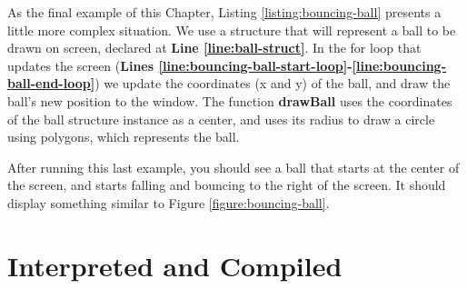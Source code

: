 \documentclass[11pt,fleqn,openany]{book} %
\begin{document}
As the final example of this Chapter, Listing \ref{listing:bouncing-ball} presents a little more complex situation. We use a structure that will represent a ball to be drawn on screen, declared at \textbf{Line \ref{line:ball-struct}}. In the for loop that updates the screen (\textbf{Lines \ref{line:bouncing-ball-start-loop}-\ref{line:bouncing-ball-end-loop}}) we update the coordinates (x and y) of the ball, and draw the ball's new position to the window. The function \textbf{drawBall} uses the coordinates of the ball structure instance as a center, and uses its radius to draw a circle using polygons, which represents the ball.

After running this last example, you should see a ball that starts at the center of the screen, and starts falling and bouncing to the right of the screen. It should display something similar to Figure \ref{figure:bouncing-ball}.


\chapter{Interpreted and Compiled}
\label{chapter:interpreted-and-compiled}

\end{document}

